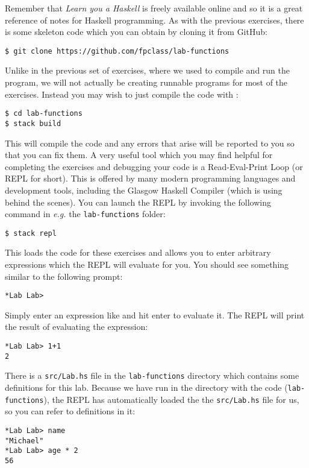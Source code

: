 Remember that \emph{Learn you a Haskell} is freely available online and so it is a great reference of notes for Haskell programming. As with the previous exercises, there is some skeleton code which you can obtain by cloning it from GitHub:
\begin{verbatim}
$ git clone https://github.com/fpclass/lab-functions
\end{verbatim}
Unlike in the previous set of exercises, where we used  to compile and run the program, we will not actually be creating runnable programs for most of the exercises. Instead you may wish to just compile the code with :
\begin{verbatim}
$ cd lab-functions
$ stack build
\end{verbatim}
This will compile the code and any errors that arise will be reported to you so that you can fix them. A very useful tool which you may find helpful for completing the exercises and debugging your code is a Read-Eval-Print Loop (or REPL for short). This is offered by many modern programming languages and development tools, including the Glasgow Haskell Compiler (which  is using behind the scenes). You can launch the REPL by invoking the following command in \emph{e.g.} the \texttt{\small lab-functions} folder:
\begin{verbatim}
$ stack repl
\end{verbatim}
This loads the code for these exercises and allows you to enter arbitrary expressions which the REPL will evaluate for you. You should see something similar to the following prompt:
\begin{verbatim}
*Lab Lab>
\end{verbatim}
Simply enter an expression like  and hit enter to evaluate it. The REPL will print the result of evaluating the expression:
\begin{verbatim}
*Lab Lab> 1+1
2
\end{verbatim}
There is a \texttt{\small src/Lab.hs} file in the \texttt{\small lab-functions} directory which contains some definitions for this lab. Because we have run  in the directory with the code (\texttt{\small lab-functions}), the REPL has automatically loaded the the \texttt{\small src/Lab.hs} file for us, so you can refer to definitions in it:
\begin{verbatim}
*Lab Lab> name
"Michael"
*Lab Lab> age * 2
56
\end{verbatim}

